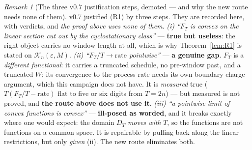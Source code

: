 \documentclass[11pt]{article}
\theoremstyle{definition}
\theoremstyle{remark}
\newtheorem{remark}{Remark}
\begin{document}
\begin{remark}[The three v0.7 justification steps, demoted --- and why
the new route needs none of them]
\label{rem:R1steps}
v0.7 justified (R1) by three steps. They are recorded here, with
verdicts, and \emph{the proof above uses none of them}.
\emph{(i) ``$F_T$ is convex on the linear section cut out by the
cyclostationary class''} --- \textbf{true but useless}: the right
object carries no window length at all, which is why
Theorem~\ref{lem:R1} is stated on $\mathcal K_n(\varepsilon,M)$.
\emph{(ii) ``$F_T/T\to\text{rate}$ pointwise''} --- \textbf{a genuine
gap}. $F_T$ is a \emph{different functional}: it carries a truncated
schedule, no pre-window past, and a truncated $W$; its convergence to
the process rate needs its own boundary-charge argument, which this
campaign does not have. It is \emph{measured} true ($T(F_T/T-
\mathrm{rate})$ flat to five or six digits from $T=2n$) --- but
measured is not proved, and \textbf{the route above does not use it}.
\emph{(iii) ``a pointwise limit of convex functions is convex''} ---
\textbf{ill-posed as worded}, and it breaks exactly where one would
expect: the domain $D_T$ \emph{moves with} $T$, so the functions are
not functions on a common space. It is repairable by pulling back
along the linear restrictions, but only \emph{given} (ii). The new
route eliminates both.
\end{remark}
\end{document}
